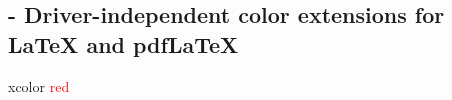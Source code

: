 
\subsection{ - Driver-independent color extensions for LaTeX and pdfLaTeX}

\begin{demo}{}{xcolor}
	\textcolor{red}{red}
\end{demo}

